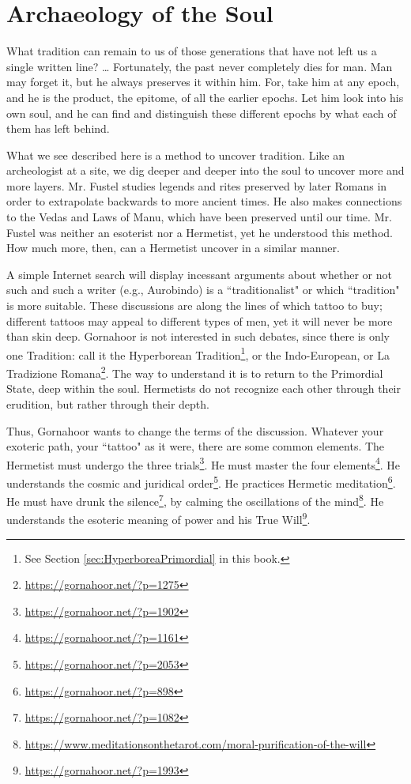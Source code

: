 \section{Archaeology of the Soul}

\begin{quotex}
What tradition can remain to us of those generations that have not left us a single written line? … Fortunately, the past never completely dies for man. Man may forget it, but he always preserves it within him. For, take him at any epoch, and he is the product, the epitome, of all the earlier epochs. Let him look into his own soul, and he can find and distinguish these different epochs by what each of them has left behind.


\end{quotex}
What we see described here is a method to uncover tradition. Like an archeologist at a site, we dig deeper and deeper into the soul to uncover more and more layers. Mr. Fustel studies legends and rites preserved by later Romans in order to extrapolate backwards to more ancient times. He also makes connections to the Vedas and Laws of Manu, which have been preserved until our time. Mr. Fustel was neither an esoterist nor a Hermetist, yet he understood this method. How much more, then, can a Hermetist uncover in a similar manner.

A simple Internet search will display incessant arguments about whether or not such and such a writer (e.g., Aurobindo) is a ``traditionalist" or which ``tradition" is more suitable. These discussions are along the lines of which tattoo to buy; different tattoos may appeal to different types of men, yet it will never be more than skin deep. Gornahoor is not interested in such debates, since there is only one Tradition: call it the Hyperborean Tradition\footnote{See Section \ref{sec:HyperboreaPrimordial} in this book.}, or the Indo-European, or La Tradizione Romana\footnote{\url{https://gornahoor.net/?p=1275}}. The way to understand it is to return to the Primordial State, deep within the soul. Hermetists do not recognize each other through their erudition, but rather through their depth. 

Thus, Gornahoor wants to change the terms of the discussion. Whatever your exoteric path, your ``tattoo" as it were, there are some common elements. The Hermetist must undergo the three trials\footnote{\url{https://gornahoor.net/?p=1902}}. He must master the four elements\footnote{\url{https://gornahoor.net/?p=1161}}. He understands the cosmic and juridical order\footnote{\url{https://gornahoor.net/?p=2053}}. He practices Hermetic meditation\footnote{\url{https://gornahoor.net/?p=898}}. He must have drunk the silence\footnote{\url{https://gornahoor.net/?p=1082}}, by calming the oscillations of the mind\footnote{\url{https://www.meditationsonthetarot.com/moral-purification-of-the-will}}. He understands the esoteric meaning of power and his True Will\footnote{\url{https://gornahoor.net/?p=1993}}.

